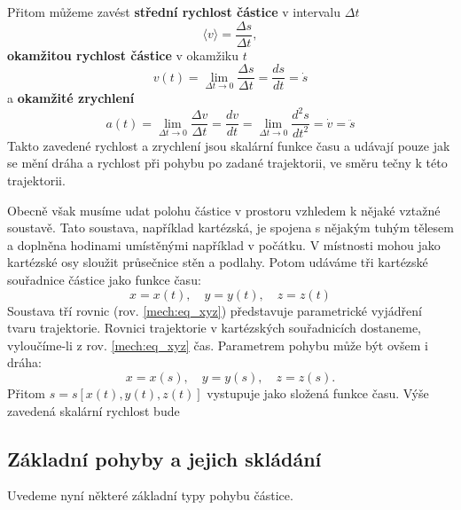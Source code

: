     Přitom můžeme zavést \textbf{střední rychlost částice} v intervalu $\Delta t$
    \begin{equation}\label{mech:eq_stredni_rychlost}
      \langle v\rangle=\frac{\Delta s}{\Delta t},
    \end{equation}
    \textbf{okamžitou rychlost částice} v okamžiku $t$
    \begin{equation}\label{mech:eq_okamzita_rychlost}
      v(t)=\lim_{\Delta t\rightarrow0}\frac{\Delta s}{\Delta t}=\frac{ds}{dt}=\dot{s}
    \end{equation}
    a \textbf{okamžité zrychlení}
    \begin{equation}\label{mech:eq_okamzite_zrychleni}
      a(t)=\lim_{\Delta t\rightarrow0}\frac{\Delta v}{\Delta t}
          =\frac{dv}{dt}=\lim_{\Delta t\rightarrow0}\frac{d^2s}{dt^2}=\dot{v}=\ddot{s}
    \end{equation}
    Takto zavedené rychlost a zrychlení jsou skalární funkce času a udávají pouze jak se mění dráha
    a rychlost při pohybu po zadané trajektorii, ve směru tečny k této trajektorii.
  
    Obecně však musíme udat polohu částice v prostoru vzhledem k nějaké vztažné soustavě. Tato
    soustava, například kartézská, je spojena s nějakým tuhým tělesem a doplněna hodinami
    umístěnými   například v počátku. V místnosti mohou jako kartézské osy sloužit průsečnice stěn
    a podlahy. Potom udáváme tři kartézské souřadnice částice jako funkce času:
    \begin{equation}\label{mech:eq_xyz}
      x=x(t),\quad y=y(t),\quad z=z(t)
    \end{equation}
    Soustava tří rovnic (rov. \ref{mech:eq_xyz}) představuje parametrické vyjádření tvaru
    trajektorie. Rovnici trajektorie v kartézských souřadnicích dostaneme, vyloučíme-li z rov.
    \ref{mech:eq_xyz} čas. Parametrem pohybu může být ovšem i dráha:
    \begin{equation}\label{mech:eq_draha}
      x = x(s),\quad y = y(s),\quad z = z(s).
    \end{equation}
    Přitom $s = s[x(t), y(t), z(t)]$ vystupuje jako složená funkce času. Výše zavedená skalární
    rychlost bude
  
    \subsection{Základní pohyby a jejich skládání}
      Uvedeme nyní některé základní typy pohybu částice.
